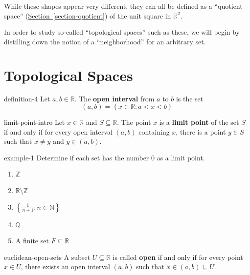 \documentclass[10pt,]{article}
\newcommand{\terminology}[1]{\textbf{#1}}
\newcommand{\mb}{\mathbb}
\newcommand{\setBuilder}[2]{\left\{#1:#2\right\}}
\newcommand{\lt}{<}
\begin{document}
\hypertarget{p-18}{}%
While these shapes appear very different, they can all be defined as a ``quotient space'' (\hyperref[section-quotient]{Section~\ref{section-quotient}}) of the unit square in \(\mathbb R^2\).%
\par
\hypertarget{p-19}{}%
In order to study so-called ``topological spaces'' such as these, we will begin by distilling down the notion of a ``neighborhood'' for an arbitrary set.%
%
%
\typeout{************************************************}
\typeout{************************************************}
%
\section[{Topological Spaces}]{Topological Spaces}\label{section-topological-spaces}
\begin{definition}{}{definition-4}%
\hypertarget{p-20}{}%
Let \(a,b\in\mb R\). The \terminology{open interval} from \(a\) to \(b\) is the set%
%
\begin{equation*}
(a,b)=\setBuilder{x\in\mb R}{a\lt x\lt b}
\end{equation*}
\end{definition}
\begin{definition}{}{limit-point-intro}%
\hypertarget{p-21}{}%
Let \(x\in\mb R\) and \(S\subseteq\mb R\). The point \(x\) is a \terminology{limit point} of the set \(S\) if and only if for every open interval \((a,b)\) containing \(x\), there is a point \(y\in S\) such that \(x\not=y\) and \(y\in(a,b)\).%
\end{definition}
\begin{example}{}{example-1}%
\hypertarget{p-22}{}%
Determine if each set has the number \(0\) as a limit point.%
\leavevmode%
\begin{enumerate}
\item\hypertarget{li-3}{}\(\mb Z\)%
\item\hypertarget{li-4}{}\(\mb R\setminus\mb Z\)%
\item\hypertarget{li-5}{}\(\setBuilder{\frac{1}{n+1}}{n\in\mb N}\)%
\item\hypertarget{li-6}{}\(\mb Q\)%
\item\hypertarget{li-7}{}A finite set \(F\subseteq\mb R\)%
\end{enumerate}
\end{example}
\begin{definition}{}{euclidean-open-sets}%
\hypertarget{p-23}{}%
A subset \(U\subseteq\mb R\) is called \terminology{open} if and only if for every point \(x\in U\), there exists an open interval \((a,b)\) such that \(x\in(a,b)\subseteq U\).%
\end{definition}
\end{document}
